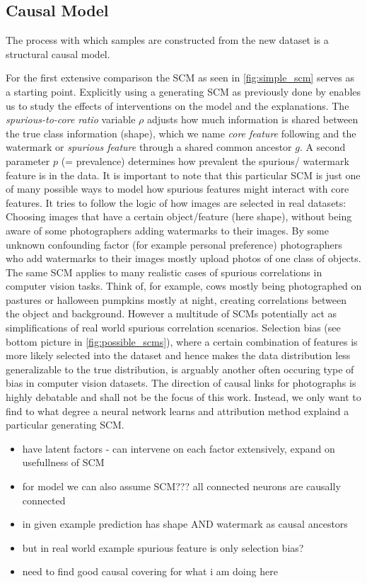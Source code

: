 \subsection{Causal Model}
The process with which samples are constructed from the new dataset is a structural causal model.

For the first extensive comparison the SCM as seen in \autoref{fig:simple_scm} serves as a starting point. Explicitly using a generating SCM as previously done by \cite{Parafita2019, Yang2019, Wilming2023} enables us to study the effects of interventions on the model and the explanations. The \textit{spurious-to-core ratio} variable $\rho$ adjusts how much information is shared between the true class information (shape), which we name \textit{core feature} following \cite{Singla2022} and the watermark or \textit{spurious feature} through a shared common ancestor $g$. A second parameter $p$ (= prevalence) determines how prevalent the spurious/ watermark feature is in the data. It is important to note that this particular SCM is just one of many possible ways to model how spurious features might interact with core features. It tries to follow the logic of how images are selected in real datasets: Choosing images that have a certain object/feature (here shape), without being aware of some photographers adding watermarks to their images. By some unknown confounding factor (for example personal preference) photographers who add watermarks to their images mostly upload photos of one class of objects.
The same SCM applies to many realistic cases of spurious correlations in computer vision tasks. Think of, for example, cows mostly being photographed on pastures or halloween pumpkins mostly at night, creating correlations between the object and background. However a multitude of SCMs potentially act as simplifications of real world spurious correlation scenarios. Selection bias (see bottom picture in \autoref{fig:possible_scms}), where a certain combination of features is more likely selected into the dataset and hence makes the data distribution less generalizable to the true distribution, is arguably another often occuring type of bias in computer vision datasets. The direction of causal links for photographs is highly debatable and shall not be the focus of this work. Instead, we only want to find to what degree a neural network learns and attribution method explaind a particular generating SCM.


    {\color{red}
        \begin{itemize}
            \item have latent factors - can intervene on each factor extensively, expand on usefullness of SCM
            \item for model we can also assume SCM??? all connected neurons are causally connected
            \item in given example prediction has shape AND watermark as causal ancestors
            \item but in real world example spurious feature is only selection bias?
            \item need to find good causal covering for what i am doing here
        \end{itemize}}

